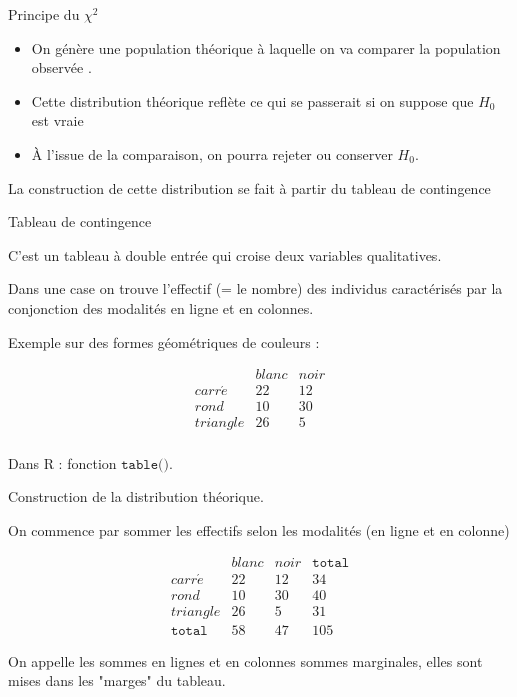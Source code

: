 \documentclass{beamer}
\begin{document}
\begin{frame}{Principe du $\chi ^2$}



\begin{itemize}
\item  On génère une \alert{population théorique} à laquelle on va comparer la \alert{population observée} .
\item Cette distribution théorique reflète ce qui se passerait si on suppose que $H_0$ est vraie 
\item À l'issue de la comparaison,  on pourra rejeter ou conserver $H_0$.
\end{itemize}

La construction de cette distribution se fait à partir du \alert{tableau de contingence}


\end{frame}

\begin{frame}{ Tableau de contingence}

C'est un tableau à double entrée qui croise deux \alert{variables qualitatives}. 


Dans une case on trouve l'\alert{effectif} (= le nombre) des individus caractérisés par la conjonction des modalités en ligne et en colonnes.


Exemple sur des formes géométriques de couleurs :

$$\begin{array}{c|c|c}
   & blanc & noir \\ 
   \hline
carr\acute{e} &  22 &   12 \\ 
  \hline
  rond &   10 &  30 \\ 
    \hline
  triangle &  26 &   5 \\ 
\end{array}$$


Dans R : fonction $\texttt{table()}$.



\end{frame}

\begin{frame}{ Construction de la distribution théorique.}

On commence par sommer les effectifs selon les modalités (en ligne et en colonne)

$$\begin{array}{c|c|c|c}
   & blanc & noir & \texttt{total}\\ 
   \hline
carr\acute{e} &  22 &   12 & 34\\ 
  \hline
  rond &   10 &  30 &  40  \\ 
    \hline
  triangle &  26 &   5 &  31\\
  \hline
  \texttt{total} & 58 & 47 & 105
  \end{array}$$

On appelle les sommes en lignes et en colonnes \alert{sommes marginales}, elles sont mises dans les "marges" du tableau.

\end{frame}
\end{document}
